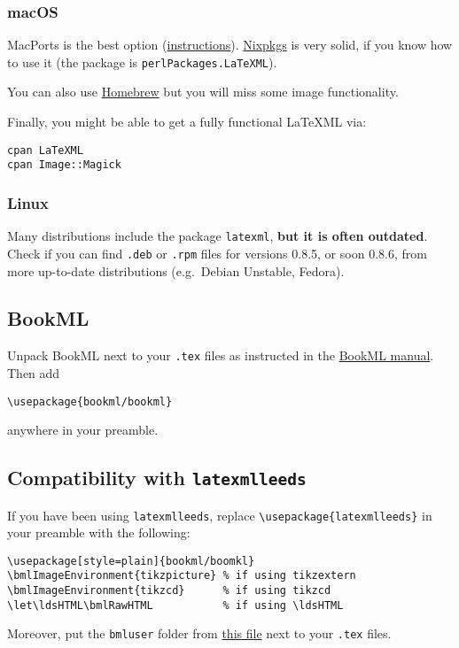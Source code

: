 \documentclass[a4paper]{article}
\let\ldsHTML\bmlRawHTML
\def\ltxinline{\lstinline[style=latexml,frame=none]}
\theoremstyle{definition}
\begin{document}
\subsubsection*{macOS}
MacPorts is the best option (\href{https://dlmf.nist.gov/LaTeXML/get.html}{instructions}). \href{https://nixos.wiki/wiki/Nixpkgs}{Nixpkgs} is very solid, if you know how to use it (the package is \texttt{perlPackages.LaTeXML}).

You can also use \href{https://brew.sh/}{Homebrew} but you will miss some image functionality.

Finally, you might be able to get a fully functional LaTeXML via:
\begin{lstlisting}
cpan LaTeXML
cpan Image::Magick 
\end{lstlisting}

\subsubsection*{Linux}
Many distributions include the package \texttt{latexml}, \textbf{but it is often outdated}. Check if you can find \texttt{.deb} or \texttt{.rpm} files for versions 0.8.5, or soon 0.8.6, from more up-to-date distributions (e.g.\ Debian Unstable, Fedora).

\subsection{BookML}
Unpack BookML next to your \texttt{.tex} files as instructed in the \href{https://vlmantova.github.io/bookml/}{BookML manual}. Then add
\begin{lstlisting}[style=latexml]
\usepackage{bookml/bookml}
\end{lstlisting}
anywhere in your preamble.

\subsection{Compatibility with \texttt{latexmlleeds}}
\label{sub:comp-latexmlleeds}
If you have been using \texttt{latexmlleeds}, replace \ltxinline|\usepackage{latexmlleeds}| in your preamble with the following:
\begin{lstlisting}[style=latexml]
\usepackage[style=plain]{bookml/boomkl}
\bmlImageEnvironment{tikzpicture} % if using tikzextern
\bmlImageEnvironment{tikzcd}      % if using tikzcd
\let\ldsHTML\bmlRawHTML           % if using \ldsHTML
\end{lstlisting}
Moreover, put the \texttt{bmluser} folder from \href{bmluser-latexmlleeds.zip}{this file} next to your \texttt{.tex} files.
\end{document}
